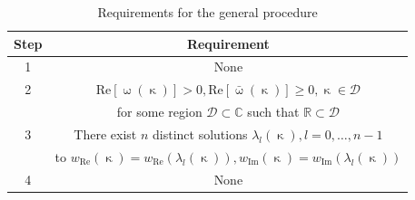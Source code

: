 \documentclass[journal,twoside,web]{ieeecolor}
\newcommand{\RR}{\mathbb{R}}
\newcommand{\CC}{\mathbb{C}}
\newcommand{\wcomplex}{\upomega}
\newcommand{\kcomplex}{\upkappa}
\begin{document}
\begin{table}[tb]
	\small
		\centering
		\caption{\sf Requirements for the general procedure}
		\label{table:sample-procedure}
		\begin{tabular}{cc}
			\hline
			Step & Requirement \\
			\hline
			1 & None\\
			2 & $\text{Re}[\wcomplex(\kcomplex)]>0,\text{Re}[\bar{\wcomplex}(\kcomplex)]\geq0, \kcomplex\in\mathcal{D}$ \\
			& for some region $\mathcal{D}\subset\CC$ such that $ \RR\subset\mathcal{D}$ \\
			3 & There exist $n$ distinct solutions $\lambda_l(\kcomplex),l=0,\ldots,n-1$
			\\ & to $w_{\text{Re}}(\kcomplex)=w_{\text{Re}}(\lambda_l(\kcomplex)), w_{\text{Im}}(\kcomplex)=w_{\text{Im}}(\lambda_l(\kcomplex))$ \\
			4 & None \\
			\hline
		\end{tabular}
	\end{table}
\end{document}
